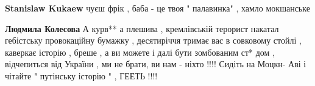 \begin{itemize}
\begin{itemize}
\textbf{Stanislaw Kukaew} чуєш фрік , баба - це твоя " палавинка" , хамло мокшанське

 
\textbf{Людмила Колесова} А курв** а плешива , кремлівській терорист накатал гебістську провокаційну бумажку , десятиріччя тримає вас в совковому стойлі , каверкає історію , бреше , а ви можете і далі бути зомбованим ст* дом , відчепиться від України , ми не брати, ви нам - ніхто !!!! Сидіть на Моцкн- Аві і чітайте " путінську історію " , ГЕЕТЬ !!!!

\end{itemize}

\end{itemize}

